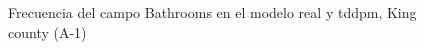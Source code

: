 \begin{figure}[H]
    \centering
    
    \caption{Frecuencia del campo Bathrooms en el modelo real y tddpm, King county (A-1)}
    \label{frecuency-tddpm-bathrooms}
\end{figure}